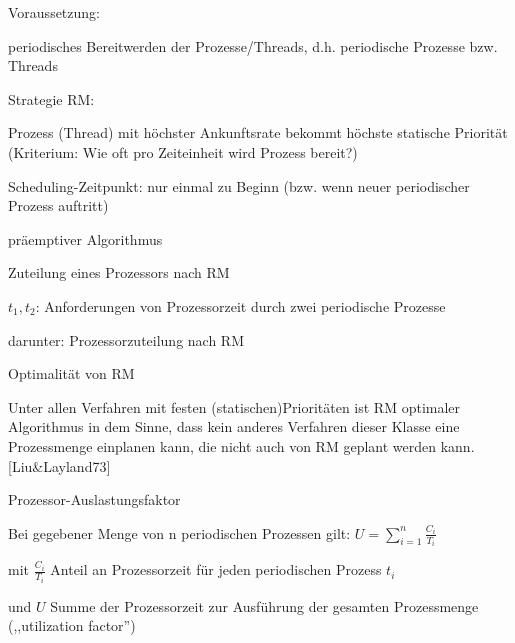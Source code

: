 \documentclass[a4paper]{article}
\begin{document}
\begin{multicols}{3}
    \begin{itemize*}
        \item
        Voraussetzung:
        \begin{itemize*}
            \item periodisches Bereitwerden der Prozesse/Threads, d.h. periodische Prozesse bzw. Threads
        \end{itemize*}
        \item
        Strategie RM:
        \begin{itemize*}
            \item Prozess (Thread) mit höchster Ankunftsrate bekommt höchste statische Priorität (Kriterium: Wie oft pro Zeiteinheit wird Prozess bereit?)
            \item Scheduling-Zeitpunkt: nur einmal zu Beginn (bzw. wenn neuer periodischer Prozess auftritt)
            \item präemptiver Algorithmus
        \end{itemize*}
        \begin{itemize*}
            \item Zuteilung eines Prozessors nach RM
            \item $t_1, t_2$: Anforderungen von Prozessorzeit durch zwei periodische Prozesse
            \item darunter: Prozessorzuteilung nach RM
        \end{itemize*}
        \item
        Optimalität von RM
        \begin{itemize*}
            \item Unter allen Verfahren mit festen (statischen)Prioritäten ist RM optimaler Algorithmus in dem Sinne, dass kein anderes Verfahren dieser Klasse eine Prozessmenge einplanen kann, die nicht auch von RM geplant werden kann. [Liu\&Layland73]
        \end{itemize*}
        \item
        Prozessor-Auslastungsfaktor
        \begin{itemize*}
            \item Bei gegebener Menge von n periodischen Prozessen gilt: $U=\sum_{i=1}^n  \frac{C_i}{T_i}$
            \item mit $\frac{C_i}{T_i}$ Anteil an Prozessorzeit für jeden periodischen Prozess $t_i$
            \item und $U$ Summe der Prozessorzeit zur Ausführung der gesamten Prozessmenge (,,utilization factor'')

\end{itemize*}
\end{itemize*}
\end{multicols}
\end{document}
